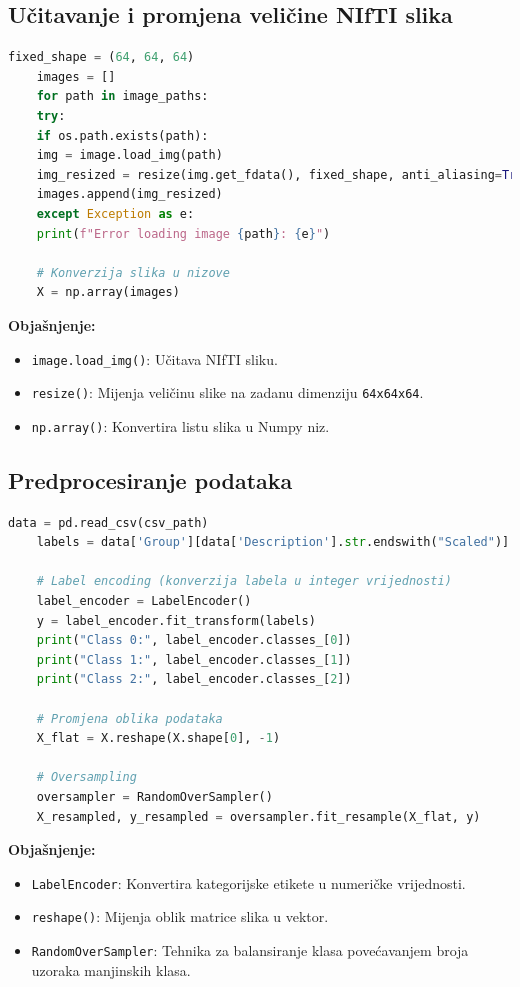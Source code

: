 \documentclass[zavrsnirad,upload]{fer}
\begin{document}
\subsection{Učitavanje i promjena veličine NIfTI slika}

\begin{lstlisting}[language=Python, caption={Učitavanje i promjena veličine NIfTI slika}]
	fixed_shape = (64, 64, 64)
	images = []
	for path in image_paths:
	try:
	if os.path.exists(path):
	img = image.load_img(path)
	img_resized = resize(img.get_fdata(), fixed_shape, anti_aliasing=True)
	images.append(img_resized)
	except Exception as e:
	print(f"Error loading image {path}: {e}")
	
	# Konverzija slika u nizove
	X = np.array(images)
\end{lstlisting}

\noindent \textbf{Objašnjenje:}
\begin{itemize}
	\item \texttt{image.load\_img()}: Učitava NIfTI sliku.
	\item \texttt{resize()}: Mijenja veličinu slike na zadanu dimenziju \texttt{64x64x64}.
	\item \texttt{np.array()}: Konvertira listu slika u Numpy niz.
\end{itemize}

\subsection{Predprocesiranje podataka}

\begin{lstlisting}[language=Python, caption={Predprocesiranje podataka}]
	data = pd.read_csv(csv_path)
	labels = data['Group'][data['Description'].str.endswith("Scaled")]
	
	# Label encoding (konverzija labela u integer vrijednosti)
	label_encoder = LabelEncoder()
	y = label_encoder.fit_transform(labels)
	print("Class 0:", label_encoder.classes_[0])
	print("Class 1:", label_encoder.classes_[1])
	print("Class 2:", label_encoder.classes_[2])
	
	# Promjena oblika podataka
	X_flat = X.reshape(X.shape[0], -1)
	
	# Oversampling
	oversampler = RandomOverSampler()
	X_resampled, y_resampled = oversampler.fit_resample(X_flat, y)
\end{lstlisting}

\noindent \textbf{Objašnjenje:}
\begin{itemize}
	\item \texttt{LabelEncoder}: Konvertira kategorijske etikete u numeričke vrijednosti.
	\item \texttt{reshape()}: Mijenja oblik matrice slika u vektor.
	\item \texttt{RandomOverSampler}: Tehnika za balansiranje klasa povećavanjem broja uzoraka manjinskih klasa.
\end{itemize}
\end{document}
